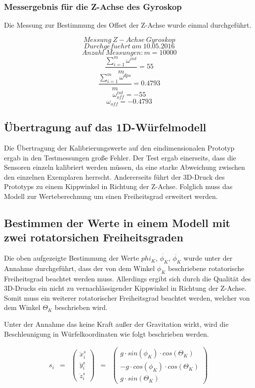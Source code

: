 \documentclass{article}
\begin{document}
\subsubsection{Messergebnis für die Z-Achse des Gyroskop}
Die Messung zur Bestimmung des Offset der Z-Achse wurde einmal durchgeführt.

\[\ Messung \ Z-Achse \ Gyroskop\]
\[\ Durchgefuehrt \ am \ 10.05.2016 \]
\[\ Anzahl \ Messungen : m = 10000 \]
\[\ \frac{\sum_{i = 1}^{m} {\omega}^{int}}{m} = 55 \]
\[\ \frac{\sum_{i = 1}^{m} {\omega}^{dps}}{m} = 0.4793 \]
\[\ {\omega}_{off}^{int} = -55 \]
\[\ {\omega}_{off} = -0.4793 \]

\subsection{Übertragung auf das 1D-Würfelmodell}
Die Übertragung der Kalibrierungswerte auf den eindimensionalen Prototyp ergab in den Testmessungen große Fehler. Der Test ergab einerseits, dass die Sensoren einzeln kalibriert werden müssen, da eine starke Abweichung zwischen den einzelnen Exemplaren herrscht. Andererseits führt der 3D-Druck des Prototyps zu einem Kippwinkel in Richtung der Z-Achse. Folglich muss das Modell zur Werteberechnung um einen Freiheitsgrad erweitert werden.

\subsection{Bestimmen der Werte in einem Modell mit zwei rotatorsichen Freiheitsgraden}
Die oben aufgezeigte Bestimmung der Werte $phi_K$, $\dot{\phi_K}$, $\ddot{\phi_K}$ wurde unter der Annahme durchgeführt, dass der von dem Winkel $\phi_K$ beschriebene rotatorische Freiheitsgrad beachtet werden muss. Allerdings ergibt sich durch die Qualität des 3D-Drucks ein nicht zu vernachlässigender Kippwinkel in Richtung der Z-Achse. Somit muss ein weiterer rotatorischer Freiheitsgrad beachtet werden, welcher von dem Winkel $\Theta_K$ beschrieben wird.

Unter der Annahme das keine Kraft außer der Gravitation wirkt, wird die Beschleunigung in Würfelkoordinaten wie folgt beschrieben werden.

\begin{equation}
\begin{array}{lclcl}
s_i 
& = & 
\begin{pmatrix} \ddot{x}^s_{i} \\ \ddot{y}^s_i \\ \ddot{z}^s_i \end{pmatrix}
& = &
\begin{pmatrix} 
g \cdot sin(\phi_K) \cdot cos(\Theta_K) \\
-g \cdot cos(\phi_K) \cdot cos(\Theta_K) \\
g \cdot sin(\Theta_K)
\end{pmatrix}
\end{array}
\end{equation}
\end{document}
